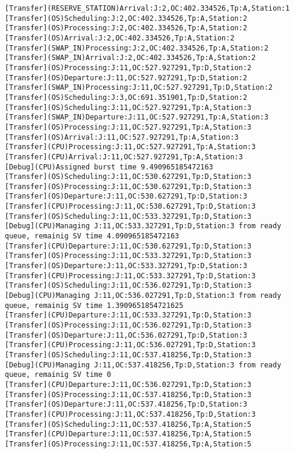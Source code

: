 \documentclass[12pt,a4paper]{article}
\begin{document}
\begin{lstlisting}
[Transfer](RESERVE_STATION)Arrival:J:2,OC:402.334526,Tp:A,Station:1
[Transfer](OS)Scheduling:J:2,OC:402.334526,Tp:A,Station:2
[Transfer](OS)Processing:J:2,OC:402.334526,Tp:A,Station:2
[Transfer](OS)Arrival:J:2,OC:402.334526,Tp:A,Station:2
[Transfer](SWAP_IN)Processing:J:2,OC:402.334526,Tp:A,Station:2
[Transfer](SWAP_IN)Arrival:J:2,OC:402.334526,Tp:A,Station:2
[Transfer](OS)Processing:J:11,OC:527.927291,Tp:D,Station:2
[Transfer](OS)Departure:J:11,OC:527.927291,Tp:D,Station:2
[Transfer](SWAP_IN)Processing:J:11,OC:527.927291,Tp:D,Station:2
[Transfer](OS)Scheduling:J:3,OC:691.351901,Tp:D,Station:2
[Transfer](OS)Scheduling:J:11,OC:527.927291,Tp:A,Station:3
[Transfer](SWAP_IN)Departure:J:11,OC:527.927291,Tp:A,Station:3
[Transfer](OS)Processing:J:11,OC:527.927291,Tp:A,Station:3
[Transfer](OS)Arrival:J:11,OC:527.927291,Tp:A,Station:3
[Transfer](CPU)Processing:J:11,OC:527.927291,Tp:A,Station:3
[Transfer](CPU)Arrival:J:11,OC:527.927291,Tp:A,Station:3
[Debug](CPU)Assigned burst time 9.490965185472163
[Transfer](OS)Scheduling:J:11,OC:530.627291,Tp:D,Station:3
[Transfer](OS)Processing:J:11,OC:530.627291,Tp:D,Station:3
[Transfer](OS)Departure:J:11,OC:530.627291,Tp:D,Station:3
[Transfer](CPU)Processing:J:11,OC:530.627291,Tp:D,Station:3
[Transfer](OS)Scheduling:J:11,OC:533.327291,Tp:D,Station:3
[Debug](CPU)Managing J:11,OC:533.327291,Tp:D,Station:3 from ready queue, remainig SV time 4.090965185472163
[Transfer](CPU)Departure:J:11,OC:530.627291,Tp:D,Station:3
[Transfer](OS)Processing:J:11,OC:533.327291,Tp:D,Station:3
[Transfer](OS)Departure:J:11,OC:533.327291,Tp:D,Station:3
[Transfer](CPU)Processing:J:11,OC:533.327291,Tp:D,Station:3
[Transfer](OS)Scheduling:J:11,OC:536.027291,Tp:D,Station:3
[Debug](CPU)Managing J:11,OC:536.027291,Tp:D,Station:3 from ready queue, remainig SV time 1.3909651854721625
[Transfer](CPU)Departure:J:11,OC:533.327291,Tp:D,Station:3
[Transfer](OS)Processing:J:11,OC:536.027291,Tp:D,Station:3
[Transfer](OS)Departure:J:11,OC:536.027291,Tp:D,Station:3
[Transfer](CPU)Processing:J:11,OC:536.027291,Tp:D,Station:3
[Transfer](OS)Scheduling:J:11,OC:537.418256,Tp:D,Station:3
[Debug](CPU)Managing J:11,OC:537.418256,Tp:D,Station:3 from ready queue, remainig SV time 0
[Transfer](CPU)Departure:J:11,OC:536.027291,Tp:D,Station:3
[Transfer](OS)Processing:J:11,OC:537.418256,Tp:D,Station:3
[Transfer](OS)Departure:J:11,OC:537.418256,Tp:D,Station:3
[Transfer](CPU)Processing:J:11,OC:537.418256,Tp:D,Station:3
[Transfer](OS)Scheduling:J:11,OC:537.418256,Tp:A,Station:5
[Transfer](CPU)Departure:J:11,OC:537.418256,Tp:A,Station:5
[Transfer](OS)Processing:J:11,OC:537.418256,Tp:A,Station:5

\end{lstlisting}
\end{document}

